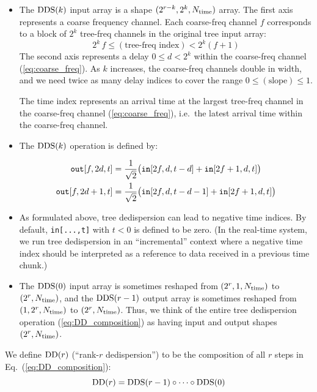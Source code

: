 \documentclass{article}
\numberwithin{equation}{section}   %
\def\DDS{{\rm DDS}}
\def\DD{{\rm DD}}
\def\nn{\nonumber}
\begin{document}
\begin{itemize}

\item
The $\DDS(k)$ input array is a shape $(2^{r-k}, 2^k, N_{\rm time})$ array.
The first axis represents a coarse frequency channel.
Each coarse-freq channel $f$ corresponds to a block of $2^k$ tree-freq channels
in the original tree input array:
\begin{equation}
2^k \, f \le (\mbox{tree-freq index}) < 2^k (f+1)  \label{eq:coarse_freq}
\end{equation}
The second axis represents a delay $0 \le d < 2^k$ within the coarse-freq channel
(\ref{eq:coarse_freq}). As $k$ increases, the coarse-freq channels double in width,
and we need twice as many delay indices to cover the range $0 \le (\mbox{slope}) \le 1$.

The time index represents an arrival time at the largest tree-freq channel
in the coarse-freq channel (\ref{eq:coarse_freq}), i.e.~the latest arrival time within the coarse-freq channel.

\item The $\DDS(k)$ operation is defined by:

\begin{align}
{\tt out}[f,2d,t] &= \frac{1}{\sqrt{2}} 
  \big( {\tt in}[2f,d,t-d] + {\tt in}[2f+1,d,t] \big) \nn \\
{\tt out}[f,2d+1,t] &= \frac{1}{\sqrt{2}} 
  \big( {\tt in}[2f,d,t-d-1] + {\tt in}[2f+1,d,t] \big)
\end{align}

\item
As formulated above, tree dedispersion can lead to negative time indices.
By default, \verb|in[...,t]| with $t<0$ is defined to be zero.
(In the real-time system, we run tree dedispersion in an ``incremental'' context where a negative time index should be interpreted as a reference to data received in a previous time chunk.)

\item The $\DDS(0)$ input array is sometimes reshaped from $(2^r,1,N_{\rm time})$
 to $(2^r,N_{\rm time})$, and the $\DDS(r-1)$ output array is sometimes reshaped
 from $(1,2^r,N_{\rm time})$ to $(2^r,N_{\rm time})$.
 Thus, we think of the entire tree dedispersion operation (\ref{eq:DD_composition}) as having input and output shapes $(2^r, N_{\rm time})$.

\end{itemize}

\par\noindent
We define $\DD(r)$ (``rank-$r$ dedispersion'') to be the composition of all $r$ steps in Eq.\ (\ref{eq:DD_composition}):
\begin{equation}
\DD(r) = \DDS(r-1) \circ \cdots \circ \DDS(0)  \label{eq:DD_DS}
\end{equation}
\end{document}
